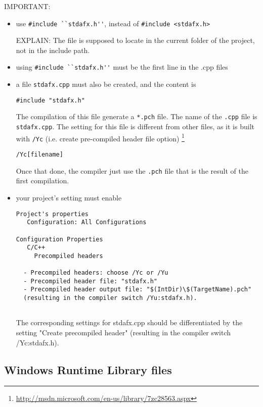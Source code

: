 IMPORTANT:
\begin{itemize}
  \item use \verb!#include ``stdafx.h''!, instead of \verb!#include <stdafx.h>!

EXPLAIN: The file is supposed to locate in the current folder of the project, not in the include path.

  \item  using \verb!#include ``stdafx.h''! must be the first line in the .cpp files
  
  \item a file \verb!stdafx.cpp! must also be created, and the content is
\begin{verbatim}
#include "stdafx.h"
\end{verbatim}
The compilation of this file generate a \verb!*.pch! file. 
The name of the \verb!.cpp! file is \verb!stdafx.cpp!. The setting for this file is
different from other files, as it is built with \verb!/Yc! (i.e. create
pre-compiled header file option)
\footnote{\url{http://msdn.microsoft.com/en-us/library/7zc28563.aspx}}
\begin{verbatim}
/Yc[filename]
\end{verbatim}

Once that done, the compiler just use the \verb!.pch! file that is the result of
the first compilation.


  \item your project's setting must enable 
\begin{verbatim}
Project's properties
   Configuration: All Configurations
   
Configuration Properties
   C/C++
     Precompiled headers

  - Precompiled headers: choose /Yc or /Yu
  - Precompiled header file: "stdafx.h"
  - Precompiled header output file: "$(IntDir)\$(TargetName).pch" 
  (resulting in the compiler switch /Yu:stdafx.h).
 
\end{verbatim}

The corresponding settings for stdafx.cpp should be differentiated 
by the setting "Create precompiled header" (resulting in the compiler switch /Yc:stdafx.h).

\end{itemize}


\subsection{Windows Runtime Library files}


